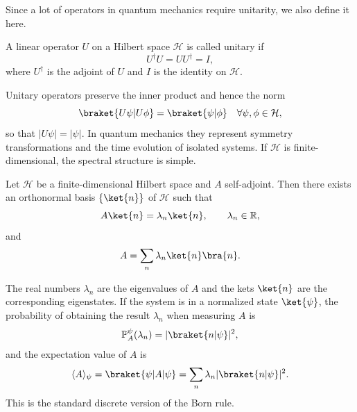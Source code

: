 Since a lot of operators in quantum mechanics require unitarity, we also define it here.
\begin{definition}
A linear operator $U$ on a Hilbert space $\mathcal{H}$ is called unitary if
\begin{equation}
U^\dagger U=U U^\dagger=I,
\end{equation}
where $U^\dagger$ is the adjoint of $U$ and $I$ is the identity on $\mathcal{H}$.
\end{definition}
Unitary operators preserve the inner product and hence the norm
\begin{equation}
\braket{U\psi\vert U\phi}=\braket{\psi\vert\phi}\quad\forall\psi,\phi\in\mathcal{H},
\end{equation}
so that $\lvert U\psi\rvert=\lvert\psi\rvert$. In quantum mechanics they represent symmetry
transformations and the time evolution of isolated systems. If $\mathcal{H}$ is finite-dimensional, the spectral structure is simple.\supercite{1378551877}
\begin{theorem}
Let $\mathcal{H}$ be a finite-dimensional Hilbert space and $A$ self-adjoint. Then there exists an orthonormal basis $\{\ket{n}\}$ of $\mathcal{H}$ such that
\begin{equation}
A\ket{n}=\lambda_n\ket{n},\qquad\lambda_n\in\mathbb{R},
\end{equation}
and
\begin{equation}
A=\sum_n\lambda_n\ket{n}\bra{n}.
\end{equation}
\end{theorem}
The real numbers $\lambda_n$ are the eigenvalues of $A$ and the kets $\ket{n}$ are the corresponding eigenstates. If the system is in a normalized state $\ket{\psi}$, the probability of obtaining the result $\lambda_n$ when measuring $A$ is
\begin{equation}
\mathbb P_A^\psi(\lambda_n)=\lvert\braket{n\vert\psi}\rvert^2,
\end{equation}
and the expectation value of $A$ is
\begin{equation}
\langle A\rangle_\psi=\braket{\psi\vert A\vert\psi}=\sum_n\lambda_n\lvert\braket{n\vert\psi}\rvert^2.
\end{equation}
This is the standard discrete version of the Born rule.\supercite{10.1007/BF01397477}

